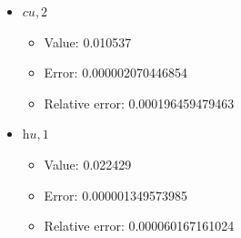 \documentclass{article}%
\begin{document}
\begin{itemize}
\begin{itemize}
		\item Error: 0.000017137470936%
		\item Relative error: 0.001551609598610%
	\end{itemize}%
	\item $\textit{cu},2$%
	\begin{itemize}%
		\item Value: 0.010537%
		\item Error: 0.000002070446854%
		\item Relative error: 0.000196459479463%
	\end{itemize}%
	\item $\textit{hu},1$%
	\begin{itemize}%
		\item Value: 0.022429%
		\item Error: 0.000001349573985%
		\item Relative error: 0.000060167161024%
	\end{itemize}%
\end{itemize}%
\end{document}
